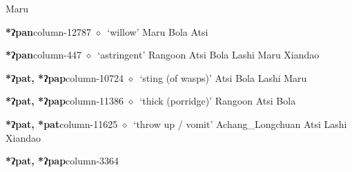          Maru 
  \item {\footnotesize \textbf{*ʔpan}}{\tiny column-12787}
         $\diamond$~`willow'
         Maru 
\hspace{1ex}
         Bola 
\hspace{1ex}
         Atsi 
  \item {\footnotesize \textbf{*ʔpan}}{\tiny column-447}
         $\diamond$~`astringent'
         Rangoon 
\hspace{1ex}
         Atsi 
\hspace{1ex}
         Bola 
\hspace{1ex}
         Lashi 
\hspace{1ex}
         Maru 
\hspace{1ex}
         Xiandao 
  \item {\footnotesize \textbf{*ʔpat, *ʔpap}}{\tiny column-10724}
         $\diamond$~`sting (of wasps)'
         Atsi 
\hspace{1ex}
         Bola 
\hspace{1ex}
         Lashi 
\hspace{1ex}
         Maru 
  \item {\footnotesize \textbf{*ʔpat, *ʔpap}}{\tiny column-11386}
         $\diamond$~`thick (porridge)'
         Rangoon 
\hspace{1ex}
         Atsi 
\hspace{1ex}
         Bola 
  \item {\footnotesize \textbf{*ʔpat, *pat}}{\tiny column-11625}
         $\diamond$~`throw up / vomit'
         Achang\_Longchuan 
\hspace{1ex}
         Atsi 
\hspace{1ex}
         Lashi 
\hspace{1ex}
         Xiandao 
  \item {\footnotesize \textbf{*ʔpat, *ʔpap}}{\tiny column-3364}
